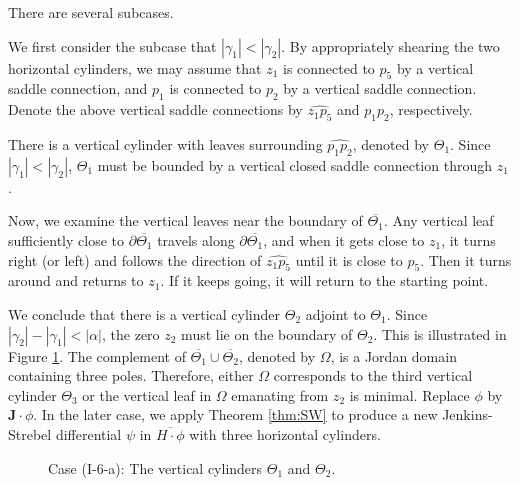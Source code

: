 \documentclass[11pt]{amsart}
\theoremstyle{plain}
\newcommand{\rot}{\mathbf{J}}
\begin{document}
There are several subcases. 





We first consider the subcase that $|\gamma_1|< |\gamma_2|$. 
By  appropriately shearing the two horizontal cylinders, we may assume that $z_1$ is connected to
$p_5$ by a vertical saddle connection, and $p_1$ is connected to $p_2$ by a vertical saddle connection. Denote the above vertical saddle connections by $\widehat{z_1p_5}$ and $\widehat{p_1p_2}$, respectively. 




There is a vertical cylinder with leaves surrounding
$\widehat{p_1p_2}$, denoted by $\Theta_1$. Since $|\gamma_1|<|\gamma_2|$, 
$\Theta_1$ must be bounded by a vertical closed saddle connection through $z_1$.  

 Now, we examine the vertical leaves near the boundary of $\overline{\Theta_1}$. Any vertical leaf  sufficiently close 
 to $\partial\overline{\Theta_1}$ travels along $\partial\overline{\Theta_1}$, and when it gets close to $z_1$,
 it turns right (or left) and follows the direction of $\widehat{z_1p_5}$ until it is close to $p_5$. Then it turns around
 and returns to $z_1$. If it keeps going, it will return to the starting point.
 
 We conclude that there is a vertical cylinder $\Theta_2$ adjoint to $\Theta_1$. Since $|\gamma_2|-|\gamma_1|< |\alpha|$, the zero $z_2$ must lie on the boundary of $\Theta_2$.  This is illustrated in Figure \ref{fig:I-7-a}.
 The complement of $\overline{\Theta_1}\cup \overline{\Theta_2}$, denoted by $\Omega$,  is a Jordan domain containing three poles.
Therefore, either $\Omega$ corresponds to the third vertical cylinder $\Theta_3$ or the vertical leaf in $\Omega$ emanating from $z_2$ is minimal. 
Replace $\phi$ by $\rot \cdot \phi$. 
In the later case, we apply Theorem \ref{thm:SW} to produce a new Jenkins-Strebel differential $\psi$ in $\overline{H\cdot \phi}$ with three horizontal cylinders. 


\begin{figure}[h]
    \centering
\caption{Case (I-6-a): The  vertical cylinders  $\Theta_1$ and $\Theta_2$. }
       \label{fig:I-7-a} 
\end{figure}
\end{document}
